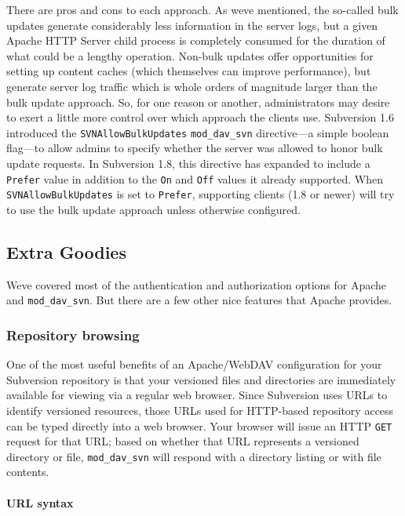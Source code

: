 There are pros and cons to each approach. As we\textquotesingle ve
mentioned, the so-called bulk updates generate considerably less
information in the server logs, but a given Apache HTTP Server child
process is completely consumed for the duration of what could be a
lengthy operation. Non-bulk updates offer opportunities for setting up
content caches (which themselves can improve performance), but generate
server log traffic which is whole orders of magnitude larger than the
bulk update approach. So, for one reason or another, administrators may
desire to exert a little more control over which approach the clients
use. Subversion 1.6 introduced the \texttt{SVNAllowBulkUpdates}
\texttt{mod\_dav\_svn} directive---a simple boolean flag---to allow
admins to specify whether the server was allowed to honor bulk update
requests. In Subversion 1.8, this directive has expanded to include a
\texttt{Prefer} value in addition to the \texttt{On} and \texttt{Off}
values it already supported. When \texttt{SVNAllowBulkUpdates} is set to
\texttt{Prefer}, supporting clients (1.8 or newer) will try to use the
bulk update approach unless otherwise configured.

\subsection{Extra Goodies}\label{svn.serverconfig.httpd.extra}

We\textquotesingle ve covered most of the authentication and
authorization options for Apache and \texttt{mod\_dav\_svn}. But there
are a few other nice features that Apache provides.

\subsubsection{Repository
browsing}\label{svn.serverconfig.httpd.extra.browsing}

One of the most useful benefits of an Apache/WebDAV configuration for
your Subversion repository is that your versioned files and directories
are immediately available for viewing via a regular web browser. Since
Subversion uses URLs to identify versioned resources, those URLs used
for HTTP-based repository access can be typed directly into a web
browser. Your browser will issue an HTTP \texttt{GET} request for that
URL; based on whether that URL represents a versioned directory or file,
\texttt{mod\_dav\_svn} will respond with a directory listing or with
file contents.

\paragraph{URL
syntax}\label{svn.serverconfig.httpd.extra.browsing.syntax}

